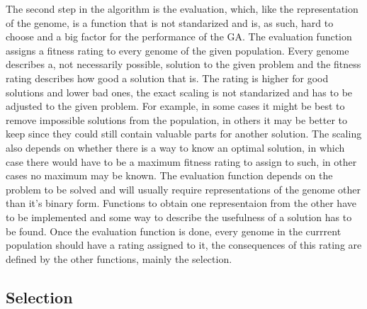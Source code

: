 The second step in the algorithm is the evaluation, which, like the representation of the genome, is a function that is not standarized and is, as such, hard to choose and a big factor for the performance of the GA. The evaluation function assigns a fitness rating to every genome of the given population. Every genome describes a, not necessarily possible, solution to the given problem and the fitness rating describes how good a solution that is. The rating is higher for good solutions and lower bad ones, the exact scaling is not standarized and has to be adjusted to the given problem. For example, in some cases it might be best to remove impossible solutions from the population, in others it may be better to keep since they could still contain valuable parts for another solution. The scaling also depends on whether there is a way to know an optimal solution, in which case there would have to be a maximum fitness rating to assign to such, in other cases no maximum may be known.
The evaluation function depends on the problem to be solved and will usually require representations of the genome other than it's binary form. Functions to obtain one representaion from the other have to be implemented and some way to describe the usefulness of a solution has to be found.
Once the evaluation function is done, every genome in the currrent population should have a rating assigned to it, the consequences of this rating are defined by the other functions, mainly the selection.

\subsection{Selection}
\label{sec:selection}

